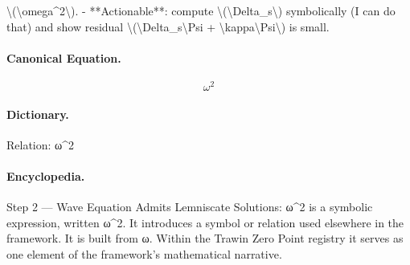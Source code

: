 \textbackslash{}(\textbackslash{}omega\textasciicircum{}2\textbackslash{}). - **Actionable**: compute \textbackslash{}(\textbackslash{}Delta\_s\textbackslash{}) symbolically (I can do that) and show residual \textbackslash{}(\textbackslash{}Delta\_s\textbackslash{}Psi + \textbackslash{}kappa\textbackslash{}Psi\textbackslash{}) is small.

\paragraph{Canonical Equation.}
\[
\omega^2
\]

\paragraph{Dictionary.}
Relation: ω\textasciicircum{}2

\paragraph{Encyclopedia.}
Step 2 — Wave Equation Admits Lemniscate Solutions: ω\textasciicircum{}2 is a symbolic expression, written ω\textasciicircum{}2. It introduces a symbol or relation used elsewhere in the framework. It is built from ω. Within the Trawin Zero Point registry it serves as one element of the framework's mathematical narrative.
